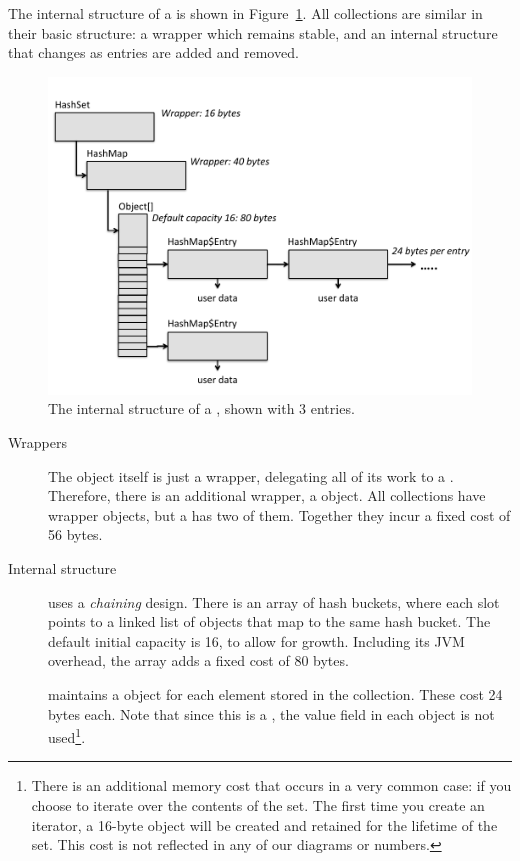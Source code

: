 The internal structure of a  is shown in
Figure~\ref{fig:inside-hashset}. All
collections are similar in their basic structure: a wrapper which remains
stable, and an internal structure that changes as entries are added and removed.
 \begin{figure}
  \centering
 \includegraphics[width=.80\textwidth]{part1/Figures/collections/inside-hashset.pdf}
  \caption{The internal structure of a , shown with 3 entries.}
  \label{fig:inside-hashset}
\end{figure}


\begin{description}
\item[Wrappers] The  object itself is just a wrapper,
delegating all of its work to a . Therefore, there is an additional wrapper,
a  object. All
collections have wrapper objects, but a  has two of them. 
Together they incur a fixed cost of 56 bytes.
 
\item[Internal structure]  uses a \emph{chaining} design. There
is an array of hash buckets, where each slot points to a linked list of
 objects that map to the same
hash bucket. The default initial capacity is 16, to allow for growth.
Including its JVM overhead, the array adds a fixed cost of 80 bytes.
 
 maintains a
 object for each element stored in the collection. 
These cost 24 bytes each. Note that since this is a
, the value field in each  object is not
used\footnote{There is an additional memory cost that occurs in a very common
case: if you choose to iterate over the contents of the set.
The first time you create an iterator, a 16-byte  object will be created and retained for the lifetime of the set. This cost is not reflected in any of
our diagrams or numbers.}.
\end{description}

